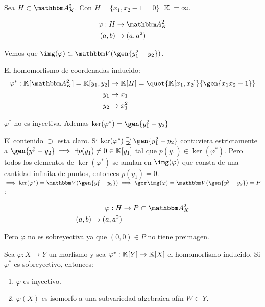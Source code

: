 \begin{example}
	Sea $H \subset  \A^2_K$. Con $H=\{x_1,x_2-1=0\}$ $|\mathbb{K}|=\infty$.
	
	\begin{align*}
		\varphi: H & \rightarrow \A^2_K \\
		(a,b) & \rightarrow (a,a^2)
	\end{align*}
	
	Vemos que $\img(\varphi) \subset \V(\gen{y_1^2-y_2})$.
	
	El homomorfismo de coordenadas inducido:
	\begin{align*}
		\varphi^*: \K[\A^2_K]=\K[y_1,y_2] & \rightarrow \K[H]=\quot{\K[x_1,x_2]}{\gen{x_1x_2-1}} \\
		y_1 & \rightarrow x_1 \\
		y_2 & \rightarrow x_1^2
	\end{align*}
	
	$\varphi^*$ no es inyectiva. Ademas $\ker(\varphi^*)=\gen{y_1^2-y_2}$
	
	El contenido $\supset$ esta claro. Si $\ker(\varphi^*) \supsetneqq \gen{y_1^2-y_2}$ contuviera estrictamente a $\gen{y_1^2-y_2} \implies \exists p(y_1)\neq 0 \in \K[y_1]$ tal que $p(y_1) \in \ker(\varphi^*)$. Pero todos los elementos de $\ker(\varphi^*)$ se anulan en $\img(\varphi)$ que consta de una cantidad infinita de puntos, entonces $p(y_1)=0$. $\implies \ker(\varphi^*)=\V(\gen{y_1^2-y_2}) \implies \cls{\img(\varphi)}= \V(\gen{y_1^2-y_2})=P$:
	
	\begin{align*}
		\varphi: H & \rightarrow P \subset \A^2_K\\
		(a,b) \rightarrow (a,a^2)
	\end{align*}
	
	Pero $\varphi$ no es sobreyectiva ya que $(0,0) \in P$ no tiene preimagen. 
	
\end{example}

\begin{lemma}
	Sea $\varphi: X \rightarrow Y$ un morfismo y sea $\varphi^*: \mathbb{K}[Y]\rightarrow \mathbb{K}[X]$ el homomorfismo inducido. Si $\varphi^*$ es sobreyectivo, entonces:
		\begin{enumerate}
			\item $\varphi$ es inyectivo.
			\item $\varphi(X)$ es isomorfo a una subvariedad algebraica afín $W \subset Y$.
		\end{enumerate}
\end{lemma}
  
